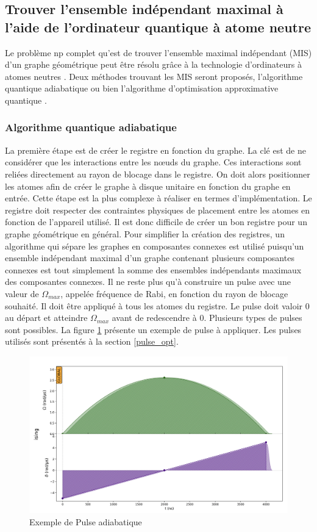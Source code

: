 \documentclass[11pt]{article}
\begin{document}
\subsection{Trouver l'ensemble indépendant maximal à l'aide de l'ordinateur quantique à atome neutre}
Le problème np complet \cite{tarjan_finding_1977} qu'est de trouver l'ensemble maximal indépendant (MIS) d'un graphe géométrique peut être résolu grâce à la technologie d'ordinateurs à atomes neutres \cite{dettmann_random_2016}. Deux méthodes trouvant les MIS seront proposés, l'algorithme quantique adiabatique ou bien l'algorithme d'optimisation approximative quantique \cite{ebadi_quantum_2022}.

\subsubsection{Algorithme quantique adiabatique}
La première étape est de créer le registre en fonction du graphe. La clé est de ne considérer que les interactions entre les nœuds du graphe. Ces interactions sont reliées directement au rayon de blocage dans le registre. On doit alors positionner les atomes afin de créer le graphe à disque unitaire en fonction du graphe en entrée. Cette étape est la plus complexe à réaliser en termes d'implémentation. Le registre doit respecter des contraintes physiques de placement entre les atomes en fonction de l'appareil utilisé. Il est donc difficile de créer un bon registre pour un graphe géométrique en général. Pour simplifier la création des registres, un algorithme qui sépare les graphes en composantes connexes est utilisé puisqu'un ensemble indépendant maximal d'un graphe contenant plusieurs composantes connexes est tout simplement la somme des ensembles indépendants maximaux des composantes connexes. Il ne reste plus qu'à construire un pulse avec une valeur de $\Omega_{max}$, appelée fréquence de Rabi, en fonction du rayon de blocage souhaité. Il doit être appliqué à tous les atomes du registre. Le pulse doit valoir 0 au départ et atteindre $\Omega_{max}$ avant de redescendre à 0. Plusieurs types de pulses sont possibles. La figure \ref{pulse_exemple} présente un exemple de pulse à appliquer. Les pulses utilisés sont présentés à la section \ref{pulse_opt}.
\begin{figure}[H]
    \centering
    \includegraphics[width = 0.6\linewidth]{images/pulse_exemple.png}
    \caption{Exemple de Pulse adiabatique}
    \label{pulse_exemple}
\end{figure}
\end{document}
